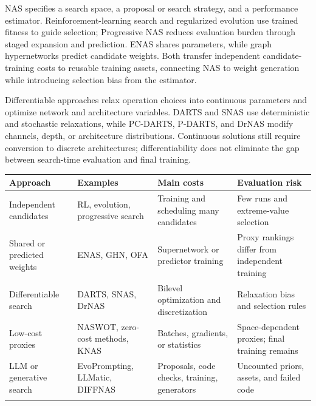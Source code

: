 NAS specifies a search space, a proposal or search strategy, and a performance estimator.\cite{r131,r143} Reinforcement-learning search and regularized evolution use trained fitness to guide selection; Progressive NAS reduces evaluation burden through staged expansion and prediction.\cite{r132,r133,r134} ENAS shares parameters, while graph hypernetworks predict candidate weights.\cite{r135,r137} Both transfer independent candidate-training costs to reusable training assets, connecting NAS to weight generation while introducing selection bias from the estimator.


Differentiable approaches relax operation choices into continuous parameters and optimize network and architecture variables. DARTS and SNAS use deterministic and stochastic relaxations, while PC-DARTS, P-DARTS, and DrNAS modify channels, depth, or architecture distributions.\cite{r136,r139,r142,r144,r151} Continuous solutions still require conversion to discrete architectures; differentiability does not eliminate the gap between search-time evaluation and final training.


\begingroup\small\setlength{\tabcolsep}{5pt}\renewcommand{\arraystretch}{1.18}

\begin{longtable}{>{\raggedright\arraybackslash}p{3.53cm}>{\raggedright\arraybackslash}p{3.53cm}>{\raggedright\arraybackslash}p{3.53cm}>{\raggedright\arraybackslash}p{3.53cm}}

\toprule

\textbf{Approach} & \textbf{Examples} & \textbf{Main costs} & \textbf{Evaluation risk}\\\midrule\endhead

Independent candidates & RL, evolution, progressive search \cite{r132,r133,r134} & Training and scheduling many candidates & Few runs and extreme-value selection\\\addlinespace[3pt]

Shared or predicted weights & ENAS, GHN, OFA \cite{r135,r137,r145} & Supernetwork or predictor training & Proxy rankings differ from independent training\\\addlinespace[3pt]

Differentiable search & DARTS, SNAS, DrNAS \cite{r136,r139,r151} & Bilevel optimization and discretization & Relaxation bias and selection rules\\\addlinespace[3pt]

Low-cost proxies & NASWOT, zero-cost methods, KNAS \cite{r149,r154,r158} & Batches, gradients, or statistics & Space-dependent proxies; final training remains\\\addlinespace[3pt]

LLM or generative search & EvoPrompting, LLMatic, DIFFNAS \cite{r160,r162,r175} & Proposals, code checks, training, generators & Uncounted priors, assets, and failed code\\\addlinespace[3pt]

\bottomrule\end{longtable}\endgroup

